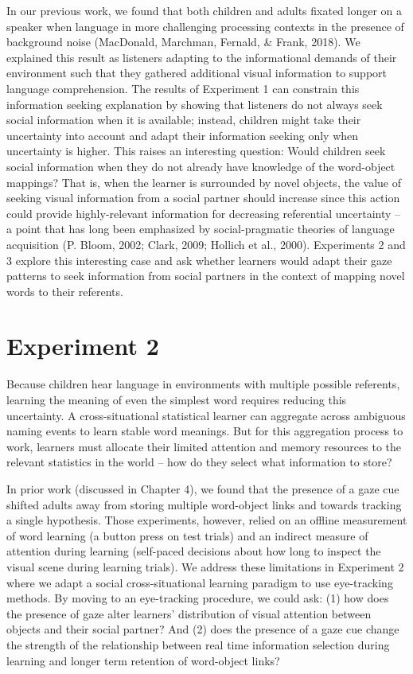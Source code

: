 \documentclass[man,floatsintext]{apa6}
\begin{document}
In our previous work, we found that both children and adults fixated
longer on a speaker when language in more challenging processing
contexts in the presence of background noise (MacDonald, Marchman,
Fernald, \& Frank, 2018). We explained this result as listeners adapting
to the informational demands of their environment such that they
gathered additional visual information to support language
comprehension. The results of Experiment 1 can constrain this
information seeking explanation by showing that listeners do not always
seek social information when it is available; instead, children might
take their uncertainty into account and adapt their information seeking
only when uncertainty is higher. This raises an interesting question:
Would children seek social information when they do not already have
knowledge of the word-object mappings? That is, when the learner is
surrounded by novel objects, the value of seeking visual information
from a social partner should increase since this action could provide
highly-relevant information for decreasing referential uncertainty -- a
point that has long been emphasized by social-pragmatic theories of
language acquisition (P. Bloom, 2002; Clark, 2009; Hollich et al.,
2000). Experiments 2 and 3 explore this interesting case and ask whether
learners would adapt their gaze patterns to seek information from social
partners in the context of mapping novel words to their referents.

\section{Experiment 2}\label{experiment-2}

Because children hear language in environments with multiple possible
referents, learning the meaning of even the simplest word requires
reducing this uncertainty. A cross-situational statistical learner can
aggregate across ambiguous naming events to learn stable word meanings.
But for this aggregation process to work, learners must allocate their
limited attention and memory resources to the relevant statistics in the
world -- how do they select what information to store?

In prior work (discussed in Chapter 4), we found that the presence of a
gaze cue shifted adults away from storing multiple word-object links and
towards tracking a single hypothesis. Those experiments, however, relied
on an offline measurement of word learning (a button press on test
trials) and an indirect measure of attention during learning (self-paced
decisions about how long to inspect the visual scene during learning
trials). We address these limitations in Experiment 2 where we adapt a
social cross-situational learning paradigm to use eye-tracking methods.
By moving to an eye-tracking procedure, we could ask: (1) how does the
presence of gaze alter learners' distribution of visual attention
between objects and their social partner? And (2) does the presence of a
gaze cue change the strength of the relationship between real time
information selection during learning and longer term retention of
word-object links?
\end{document}
